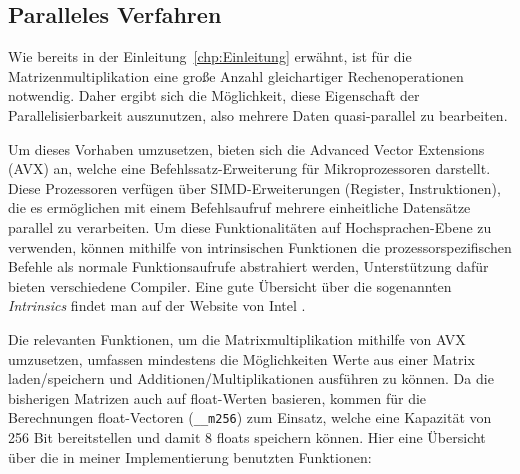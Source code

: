 \documentclass[a4paper,11pt]{scrartcl}
\begin{document}
\subsection{Paralleles Verfahren}
Wie bereits in der Einleitung~\ref{chp:Einleitung} erwähnt, ist für die 
Matrizenmultiplikation eine große Anzahl gleichartiger Rechenoperationen notwendig.
Daher ergibt sich die Möglichkeit, diese Eigenschaft der Parallelisierbarkeit auszunutzen,
also mehrere Daten quasi-parallel zu bearbeiten.\newline

Um dieses Vorhaben umzusetzen, bieten sich die Advanced Vector Extensions (AVX) an,
welche eine Befehlssatz-Erweiterung für Mikroprozessoren darstellt. Diese Prozessoren
verfügen über SIMD-Erweiterungen (Register, Instruktionen), die es ermöglichen mit einem Befehlsaufruf  mehrere einheitliche Datensätze parallel zu verarbeiten. Um diese Funktionalitäten auf 
Hochsprachen-Ebene zu verwenden, können mithilfe von intrinsischen Funktionen 
die prozessorspezifischen Befehle als normale Funktionsaufrufe abstrahiert werden,
Unterstützung dafür bieten verschiedene Compiler. Eine gute Übersicht über die sogenannten
\emph{Intrinsics} findet man auf der Website von Intel \cite{intr}.\newline

Die relevanten Funktionen, um die Matrixmultiplikation mithilfe von AVX umzusetzen,
umfassen mindestens die Möglichkeiten Werte aus einer Matrix laden/speichern
und Additionen/Multiplikationen ausführen zu können. Da die bisherigen Matrizen auch auf 
float-Werten basieren, kommen für die Berechnungen float-Vectoren (\texttt{\_\_m256}) zum
Einsatz, welche eine Kapazität von 256 Bit bereitstellen und damit 8 floats speichern
können. Hier eine Übersicht über die in meiner Implementierung benutzten Funktionen:\newline
\end{document}
